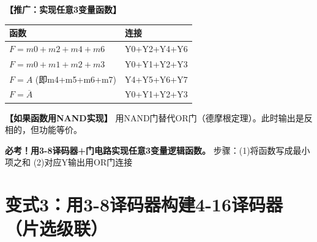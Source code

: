 \begin{detailbox}[完整教学]
\textbf{【推广：实现任意3变量函数】}
\begin{center}
\begin{tabular}{|l|l|}
\hline
\textbf{函数} & \textbf{连接} \\
\hline
$F=m0+m2+m4+m6$ & Y0+Y2+Y4+Y6 \\
$F=m0+m1+m2+m3$ & Y0+Y1+Y2+Y3 \\
$F=A$ (即m4+m5+m6+m7) & Y4+Y5+Y6+Y7 \\
$F=\overline{A}$ & Y0+Y1+Y2+Y3 \\
\hline
\end{tabular}
\end{center}

\textbf{【如果函数用NAND实现】}
用NAND门替代OR门（德摩根定理）。此时输出是反相的，但功能等价。

\begin{examfocus}
\textbf{必考！用3-8译码器+门电路实现任意3变量逻辑函数。}
步骤：(1)将函数写成最小项之和 (2)对应Y输出用OR门连接
\end{examfocus}

\end{detailbox}


\section{变式3：用3-8译码器构建4-16译码器（片选级联）}

